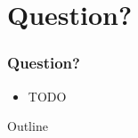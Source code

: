 \documentclass{beamer}
\begin{document}
\section{Question?}
%
\begin{frame}
\frametitle{Question?}
%
\begin{itemize}
%
\item TODO
%
\end{itemize}
\end{frame}

\begin{frame}[shrink=20]{Outline}

\tableofcontents
\end{frame}
\end{document}
